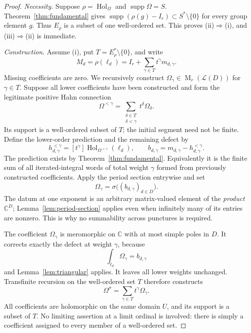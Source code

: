 \documentclass[11pt,letterpaper]{article}
\numberwithin{equation}{section}
\theoremstyle{definition}
\theoremstyle{remark}
\newcommand{\C}{\mathbb C}
\newcommand{\LL}{\mathcal L}
\newcommand{\supp}{\operatorname{supp}}
\newcommand{\Hol}{\operatorname{Hol}}
\newcommand{\Mat}{\operatorname{M}}
\newcommand{\coeff}[1]{[t^{#1}]}
\begin{document}
\begin{proof}
\emph{Necessity.} Suppose $\rho=\Hol_\Omega$ and $\supp\Omega=S$.
Theorem~\ref{thm:fundamental} gives
$\supp(\rho(g)-I_r)\subset S^*\setminus\{0\}$ for every group element $g$.
Thus $E_\rho$ is a subset of one well-ordered set. This proves
(ii)$\Rightarrow$(i), and (iii)$\Rightarrow$(ii) is immediate.

\emph{Construction.} Assume (i), put
$T=E_\rho^*\setminus\{0\}$, and write
\[
 M_d=\rho(\ell_d)=I_r+\sum_{\gamma\in T}t^\gamma m_{d,\gamma}.
\]
Missing coefficients are zero. We recursively construct
$\Omega_\gamma\in\Mat_r(\LL(D))$ for $\gamma\in T$. Suppose all lower
coefficients have been constructed and form the legitimate positive Hahn
connection
\[
 \Omega^{<\gamma}=\sum_{\substack{\delta\in T\\\delta<\gamma}}
                            t^\delta\Omega_\delta.
\]
Its support is a well-ordered subset of $T$; the initial segment need not be
finite. Define the lower-order prediction and the remaining defect by
\begin{equation}\label{eq:defect}
 h_{d,\gamma}^{<\gamma}
       =\coeff{\gamma}\Hol_{\Omega^{<\gamma}}(\ell_d),
 \qquad
 b_{d,\gamma}=m_{d,\gamma}-h_{d,\gamma}^{<\gamma}.
\end{equation}
The prediction exists by Theorem~\ref{thm:fundamental}. Equivalently it is
the finite sum of all iterated-integral words of total weight $\gamma$
formed from previously constructed coefficients. Apply the period section
entrywise and set
\begin{equation}\label{eq:RH-recursion}
 \boxed{\quad \Omega_\gamma
       =\sigma\bigl((b_{d,\gamma})_{d\in D}\bigr).\quad}
\end{equation}
The datum at one exponent is an arbitrary matrix-valued element of the
\emph{product} $\C^D$; Lemma~\ref{lem:period-section} applies even when
infinitely many of its entries are nonzero. This is why no summability
across punctures is required.

The coefficient $\Omega_\gamma$ is meromorphic on $\C$ with at most simple
poles in $D$. It corrects exactly the defect at weight $\gamma$, because
\[
 \int_{\ell_d}\Omega_\gamma=b_{d,\gamma}
\]
and Lemma~\ref{lem:triangular} applies. It leaves all lower weights
unchanged. Transfinite recursion on the well-ordered set $T$ therefore
constructs
\[
 \Omega^\sigma=\sum_{\gamma\in T}t^\gamma\Omega_\gamma.
\]
All coefficients are holomorphic on the same domain $U$, and its support is
a subset of $T$. No limiting assertion at a limit ordinal is involved:
there is simply a coefficient assigned to every member of a well-ordered
set.


\end{proof}
\end{document}
